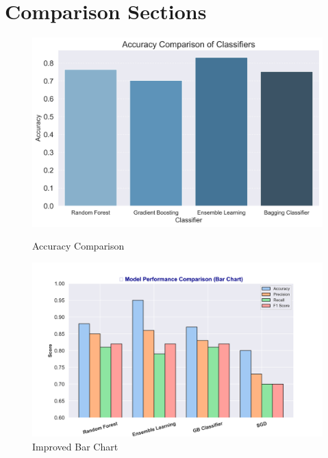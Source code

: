 \section{Comparison Sections}

\begin{figure}[H]
	\centering
	\begin{minipage}[b]{0.45\textwidth}
		\centering
		\includegraphics[width=\textwidth]{img/paper_1/accuracy_comparison.png}
		\caption{Accuracy Comparison}
	\end{minipage}
	\hfill
	\begin{minipage}[b]{0.45\textwidth}
		\centering
		\includegraphics[width=\textwidth]{img/paper_1/bar_chart_improved.png}
		\caption{Improved Bar Chart}
	\end{minipage}
	
	\vspace{1em}
	

\end{figure}
